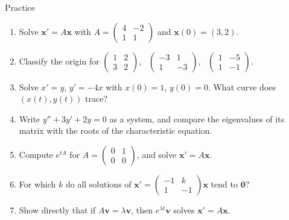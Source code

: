 \documentclass[10pt]{wosm-slides}
\newcommand{\vx}{\mathbf{x}}
\DeclareRobustCommand{\vv}{\mathbf{v}}
\begin{document}
\begin{frame}{Practice}
  \small
  \begin{enumerate}
    \item Solve $\vx' = A\vx$ with $A = \begin{pmatrix} 4 & -2 \\ 1 & 1 \end{pmatrix}$ and $\vx(0) = (3, 2)$.
    \item Classify the origin for $\begin{pmatrix} 1 & 2 \\ 3 & 2 \end{pmatrix}$, \
      $\begin{pmatrix} -3 & 1 \\ 1 & -3 \end{pmatrix}$, \ $\begin{pmatrix} 1 & -5 \\ 1 & -1 \end{pmatrix}$.
    \item Solve $x' = y$, $y' = -4x$ with $x(0) = 1$, $y(0) = 0$. What curve does $(x(t), y(t))$ trace?
    \item Write $y'' + 3y' + 2y = 0$ as a system, and compare the eigenvalues of its matrix with the
      roots of the characteristic equation.
    \item Compute $e^{tA}$ for $A = \begin{pmatrix} 0 & 1 \\ 0 & 0 \end{pmatrix}$, and solve $\vx' = A\vx$.
    \item For which $k$ do all solutions of $\vx' = \begin{pmatrix} -1 & k \\ 1 & -1 \end{pmatrix}\vx$ tend to $\mathbf 0$?
    \item Show directly that if $A\vv = \lambda\vv$, then $e^{\lambda t}\vv$ solves $\vx' = A\vx$.
  \end{enumerate}
\end{frame}
\end{document}
